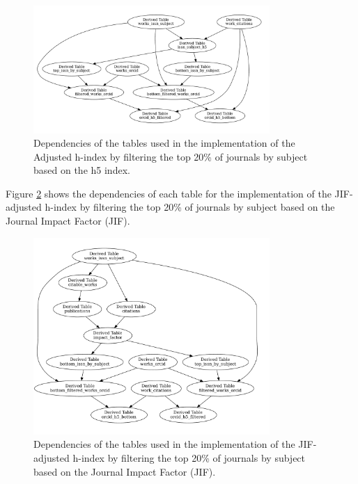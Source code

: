 \begin{figure}[H]
      \centering
      \includegraphics[width=0.8\textwidth]{../figs/h5.pdf}
      \caption{Dependencies of the tables used in the implementation of the Adjusted h-index by filtering the top 20\% of journals by subject based on the h5 index.}
      \label{fig:tables}
\end{figure}

Figure \ref{fig:tables2} shows the dependencies of each table for the
implementation of the JIF-adjusted h-index by filtering the top 20\% of
journals by subject based on the Journal Impact Factor (JIF).

\begin{figure}[H]
      \centering
      \includegraphics[width=0.8\textwidth]{../figs/impact.pdf}
      \caption{Dependencies of the tables used in the implementation of the JIF-adjusted h-index by filtering the top 20\% of journals by subject based on the Journal Impact Factor (JIF).}
      \label{fig:tables2}
\end{figure}
%

